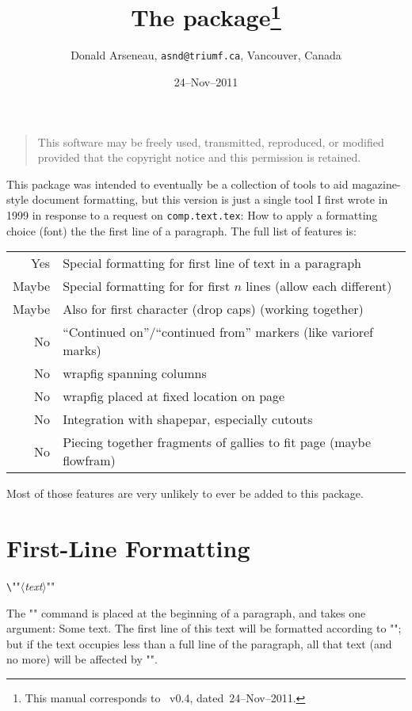 \documentclass[parskip=half, pagesize=auto, 12pt]{scrartcl}
\title{The \pkg{magaz} package\thanks{This manual corresponds to \pkg{magaz}~v0.4, dated~24--Nov--2011.}}
\author{Donald Arseneau,   \texttt{asnd@triumf.ca},  Vancouver, Canada}
\date{24--Nov--2011}
\makeatletter
\newcommand*{\cs}[1]{\texttt{\textbackslash#1}}
\newcommand*{\meta}[1]{\ensuremath{\langle}\textsl{#1}\ensuremath{\rangle}}
\newcommand*{\cmd}[1]{\cs{\expandafter\@gobble\string#1}}
\makeatother
\begin{document}
\maketitle

\begin{quote}
  \small
  This software may be freely used, transmitted, reproduced, or modified
  provided that the copyright notice and this permission is retained.
\end{quote}

This package was intended to eventually be a collection of tools to aid
magazine-style document formatting, but this version is just a single  
tool I first wrote in 1999 in response to a request on \texttt{comp.text.tex}:
How to apply a formatting choice (font) the the first line of a paragraph. 
The full list of features is:

\begin{center}
\begin{tabular}{@{}rl@{}}
  Yes & Special formatting for first line of text in a paragraph          \\
Maybe & Special formatting for for first $n$ lines (allow each different) \\
Maybe & Also for first character (drop caps) (working together)           \\
  No  & ``Continued on''/``continued from'' markers (like varioref marks) \\
  No  & wrapfig spanning columns                                          \\
  No  & wrapfig placed at fixed location on page                          \\
  No  & Integration with shapepar, especially cutouts                     \\
  No  & Piecing together fragments of gallies to fit page (maybe flowfram)
\end{tabular}
\end{center}

Most of those features are very unlikely to ever be added to this package.

\section*{First-Line Formatting}

\noindent \cmd{\FirstLine}"{"\meta{text}"}"

\medskip

The "\FirstLine" command is placed at the beginning of a paragraph, 
and takes one argument: Some text. The first line of this text will 
be formatted according to "\FirstLineFont"; but if the text occupies 
less than a full line of the paragraph, all that text (and no more) 
will be affected by "\FirstLineFont".
\end{document}
